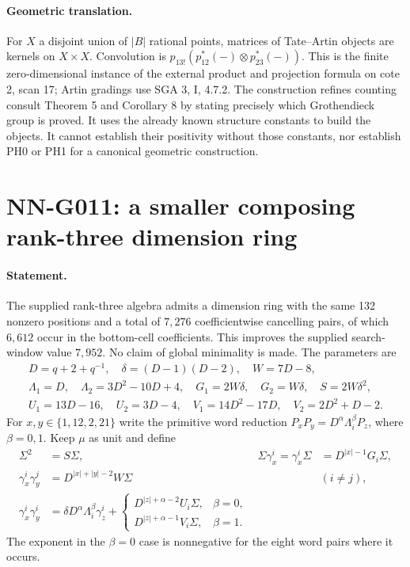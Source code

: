 \paragraph{Geometric translation.}
For $X$ a disjoint union of $|B|$ rational points, matrices of
Tate--Artin objects are kernels on $X\times X$. Convolution is
$p_{13!}(p_{12}^*(-)\otimes p_{23}^*(-))$. This is the finite
zero-dimensional instance of the external product and projection
formula on cote 2, scan 17; Artin gradings use SGA 3, I, 4.7.2.
The construction refines counting consult Theorem 5 and
Corollary 8 by stating precisely which Grothendieck group is
proved. It uses the already known structure constants to build
the objects. It cannot establish their positivity without those
constants, nor establish PH0 or PH1 for a canonical geometric
construction.



\section{NN-G011: a smaller composing rank-three dimension ring}
\paragraph{Statement.}
The supplied rank-three algebra admits a dimension ring with
the same 132 nonzero positions and a total of $7,276$
coefficientwise cancelling pairs, of which $6,612$ occur in
the bottom-cell coefficients. This improves the supplied
search-window value $7,952$. No claim of global minimality is
made. The parameters are
\[
 \begin{gathered}
 D=q+2+q^{-1},\quad\delta=(D-1)(D-2),\quad W=7D-8,\\
 \Lambda_1=D,\quad\Lambda_2=3D^2-10D+4,\quad
 G_1=2W\delta,\quad G_2=W\delta,\quad S=2W\delta^2,\\
 U_1=13D-16,\quad U_2=3D-4,\quad
 V_1=14D^2-17D,\quad V_2=2D^2+D-2.
 \end{gathered}                                             \tag{G011.1}
\]
For $x,y\in\{1,12,2,21\}$ write the primitive word reduction
$P_xP_y=D^\alpha\Lambda_i^\beta P_z$, where $\beta=0,1$.
Keep $\mu$ as unit and define
\[
 \begin{aligned}
 \Sigma^2&=S\Sigma,&
 \Sigma\gamma_x^i=\gamma_x^i\Sigma&=D^{|x|-1}G_i\Sigma,\\
 \gamma_x^i\gamma_y^j&=D^{|x|+|y|-2}W\Sigma&&(i\ne j),\\
 \gamma_x^i\gamma_y^i&=\delta D^\alpha\Lambda_i^\beta\gamma_z^i
       +\begin{cases}
          D^{|z|+\alpha-2}U_i\Sigma,&\beta=0,\\
          D^{|z|+\alpha-1}V_i\Sigma,&\beta=1.
        \end{cases}
 \end{aligned}                                             \tag{G011.2}
\]
The exponent in the $\beta=0$ case is nonnegative for the
eight word pairs where it occurs.

